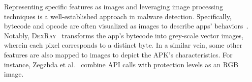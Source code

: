 Representing specific features as images and leveraging image processing techniques is a well-established approach in malware detection.
Specifically, bytecode and opcode are often visualized as images to describe apps' behaviors~\cite{mclaughlin2017deep,daoudi2021dexray,hsien2018r2,xiao2019image,ding2020android}.
Notably, \textsc{DexRay}~\cite{daoudi2021dexray} transforms the app's bytecode into grey-scale vector images, wherein each pixel corresponds to a distinct byte.
In a similar vein, some other features are also mapped to images to depict the APK's characteristics.
For instance, Zegzhda et al.~\cite{zegzhda2018applying} combine API calls with protection levels as an RGB image.

